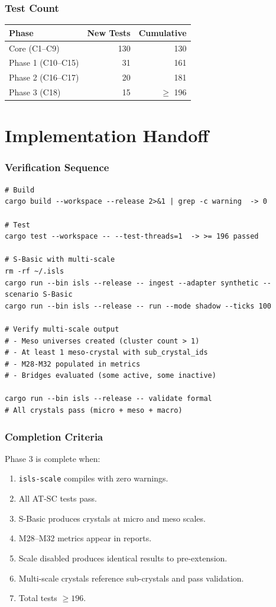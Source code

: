 \documentclass[11pt,a4paper,twoside]{article}
\theoremstyle{definition}
\theoremstyle{plain}
\theoremstyle{remark}
\begin{document}
\section{Test Count}

\begin{tabular}{l r r}
\toprule
\textbf{Phase} & \textbf{New Tests} & \textbf{Cumulative} \\
\midrule
Core (C1--C9) & 130 & 130 \\
Phase 1 (C10--C15) & 31 & 161 \\
Phase 2 (C16--C17) & 20 & 181 \\
Phase 3 (C18) & 15 & $\ge$ 196 \\
\bottomrule
\end{tabular}


\part{Implementation Handoff}\label{part:handoff}

\section{Verification Sequence}

\begin{verbatim}
# Build
cargo build --workspace --release 2>&1 | grep -c warning  -> 0

# Test
cargo test --workspace -- --test-threads=1  -> >= 196 passed

# S-Basic with multi-scale
rm -rf ~/.isls
cargo run --bin isls --release -- ingest --adapter synthetic --scenario S-Basic
cargo run --bin isls --release -- run --mode shadow --ticks 100

# Verify multi-scale output
# - Meso universes created (cluster count > 1)
# - At least 1 meso-crystal with sub_crystal_ids
# - M28-M32 populated in metrics
# - Bridges evaluated (some active, some inactive)

cargo run --bin isls --release -- validate formal
# All crystals pass (micro + meso + macro)
\end{verbatim}

\section{Completion Criteria}

Phase 3 is complete when:
\begin{enumerate}[nosep]
  \item \texttt{isls-scale} compiles with zero warnings.
  \item All AT-SC tests pass.
  \item S-Basic produces crystals at micro and meso scales.
  \item M28--M32 metrics appear in reports.
  \item Scale disabled produces identical results to pre-extension.
  \item Multi-scale crystals reference sub-crystals and pass validation.
  \item Total tests $\ge 196$.
\end{enumerate}
\end{document}
